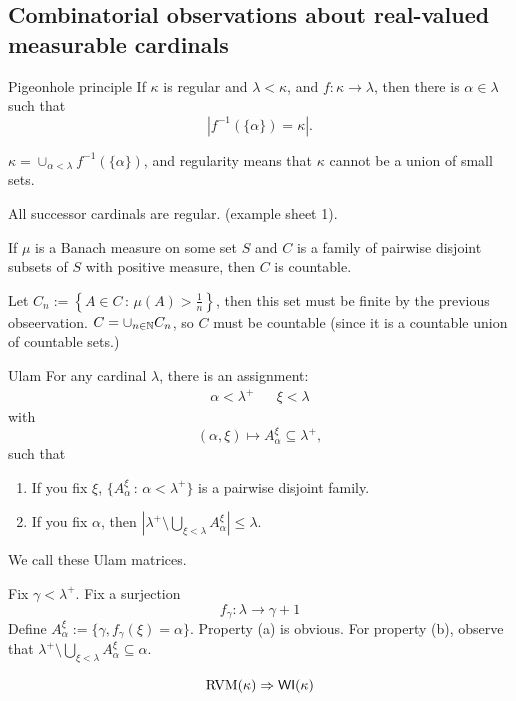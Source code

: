 \documentclass{article}
\begin{document}
\subsection{Combinatorial observations about real-valued measurable cardinals}
\begin{fancylem}{Pigeonhole principle}
    If $\kappa$ is regular and $\lambda < \kappa$, and $f: \kappa \to \lambda$, then there is $\alpha \in \lambda$ such that \[ |f^{-1}(\{\alpha\})=\kappa|.\]
\end{fancylem}
\proof $\kappa = \cup_{\alpha<\lambda} f^{-1}(\{\alpha\})$, and regularity means that $\kappa$ cannot be a union of small sets. \endproof
\begin{fancylem}{}
    All successor cardinals are regular. (example sheet 1).
\end{fancylem}
\begin{fancylem}{}
    If $\mu$ is a Banach measure on some set $S$ and $C$ is a family of pairwise disjoint subsets of $S$ with positive measure, then $C$ is countable.
\end{fancylem}
\proof Let $C_{n} := \left\{A \in C \, : \, \mu(A) > \frac{1}{n}\right\}$, then this set must be finite by the previous obseervation. $C = \cup_{n \in \mathbb{N}} C_{n}$, so $C$ must be countable (since it is a countable union of countable sets.) \endproof
\begin{fancylem}{Ulam}
    For any cardinal $\lambda$, there is an assignment: \begin{align*}
        \alpha < \lambda^{+} & & \xi < \lambda
    \end{align*}
    with \[ (\alpha,\xi) \mapsto A_{\alpha}^{\xi} \subseteq \lambda^{+},\]
    such that \begin{enumerate}
        \item[(a)] If you fix $\xi$, $\{A_{\alpha}^{\xi} \, : \, \alpha < \lambda^{+}\}$ is a pairwise disjoint family.
        \item[(b)] If you fix $\alpha$, then $ \left| \lambda^{+} \setminus \bigcup_{\xi < \lambda}A_{\alpha}^{\xi} \right| \leq \lambda$.
    \end{enumerate}
    We call these Ulam matrices.
\end{fancylem}
\proof Fix $\gamma < \lambda^{+}$. Fix a surjection \[ f_{\gamma} : \lambda \to \gamma+1\]
Define $A_{\alpha}^{\xi} := \{\gamma, f_{\gamma}(\xi) = \alpha\}$. Property (a) is obvious. For property (b), observe that $\lambda^{+} \setminus \bigcup_{\xi < \lambda}A_{\alpha}^{\xi} \subseteq \alpha$.
\endproof 
\begin{fancythm}{}
    \[ \operatorname{RVM}(\kappa) \Rightarrow \mathsf{WI}(\kappa)\]
\end{fancythm}
\end{document}
